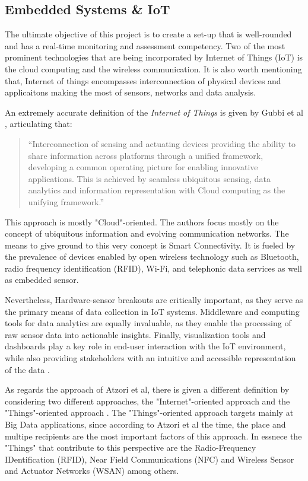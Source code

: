 \subsection{Embedded Systems \& IoT} 
{
The ultimate objective of this project is to create a set-up that is well-rounded and has a real-time monitoring and assessment competency. Two of the most prominent technologies that are being incorporated by Internet of Things (IoT) is the cloud computing and the wireless communication. It is also worth mentioning that, Internet of things encompasses interconnection of physical devices and applicaitons making the most of sensors, networks and data analysis. 

An extremely accurate definition of the \textit{Internet of Things} is given by Gubbi et al \cite{Gubbi2013}, articulating that:

\begin{quote}
    ``Interconnection of sensing and actuating devices providing the ability to share information across platforms through a unified framework, developing a common operating picture for enabling innovative applications. This is achieved by seamless ubiquitous sensing, data analytics and information representation with Cloud computing as the unifying framework.''
\end{quote}

This approach is mostly "Cloud"-oriented. The authors focus mostly on the concept of ubiquitous information and evolving communication networks. The means to give ground to this very concept is Smart Connectivity. It is fueled by the prevalence of devices enabled
by open wireless technology such as Bluetooth, radio frequency
identification (RFID), Wi-Fi, and telephonic data services as well as
embedded sensor.

Nevertheless, Hardware-sensor breakouts are critically important, as they serve as the primary means of data collection in IoT systems. Middleware and computing tools for data analytics are equally invaluable, as they enable the processing of raw sensor data into actionable insights. Finally, visualization tools and dashboards play a key role in end-user interaction with the IoT environment, while also providing stakeholders with an intuitive and accessible representation of the data \cite{Gubbi2013}.

As regards the approach of Atzori et al, there is given a different definition by considering two different approaches, the "Internet"-oriented approach and the "Things"-oriented approach \cite{Atzori2010}. The "Things"-oriented approach targets mainly at Big Data applications, since according to Atzori et al the time, the place and multipe recipients are the most important factors of this approach. In essnece the "Things" that contribute to this perspective are the Radio-Frequency IDentification (RFID), Near Field Communications (NFC) and Wireless Sensor and Actuator Networks (WSAN) among others.

}
